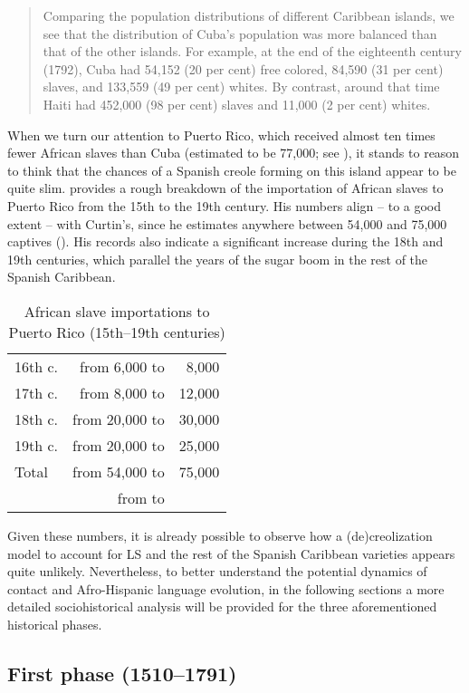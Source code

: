 \documentclass[output=paper,colorlinks,citecolor=brown]{langscibook}
\begin{document}
\begin{quote}
Comparing the population distributions of different Caribbean islands, we see that the distribution of Cuba’s population was more balanced than that of the other islands. For example, at the end of the eighteenth century (1792), Cuba had 54,152 (20 per cent) free colored, 84,590 (31 per cent) slaves, and 133,559 (49 per cent) whites. By contrast, around that time Haiti had 452,000 (98 per cent) slaves and 11,000 (2 per cent) whites.
\end{quote}

When we turn our attention to Puerto Rico, which received almost ten times fewer African slaves than Cuba (estimated to be 77,000; see ), it stands to reason to think that the chances of a Spanish creole forming on this island appear to be quite slim. \citet[72]{AlvarezNazario1974} provides a rough breakdown of the importation of African slaves to Puerto Rico from the 15th to the 19th century. His numbers align -- to a good extent -- with Curtin’s, since he estimates anywhere between 54,000 and 75,000 captives (). His records also indicate a significant increase during the 18th and 19th centuries, which parallel the years of the sugar boom in the rest of the Spanish Caribbean.

\begin{table}
\begin{tabular}{l>{from }r<{ to}@{ }r}
\lsptoprule
 {16th c.} & 6,000  & 8,000\\
 {17th c.} & 8,000  & 12,000\\
 {18th c.} & 20,000 & 30,000\\
 {19th c.} & 20,000 & 25,000\\
 {Total}   & 54,000 & 75,000\\
\lspbottomrule
\end{tabular}
\caption{African slave importations to Puerto Rico (15th–19th centuries)\label{tab:visconti:3}}
\end{table}

Given these numbers, it is already possible to observe how a (de)creolization model to account for LS and the rest of the Spanish Caribbean varieties appears quite unlikely. Nevertheless, to better understand the potential dynamics of contact and Afro-Hispanic language evolution, in the following sections a more detailed sociohistorical analysis will be provided for the three aforementioned historical phases.

\subsection{First phase (1510--1791)} \label{sec:visconti:5}
\end{document}
